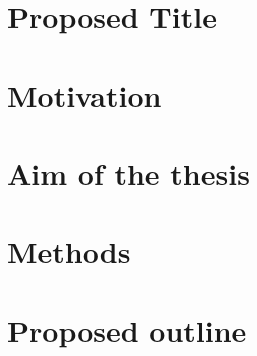 %
%
\section{Proposed Title }
\label{sec:intro:protitle}

%
%
\section{Motivation}
\label{sec:intro:motivation}

%
%
\section{Aim of the thesis}
\label{sec:intro:aim}



\section{Methods}
\label{sec:intro:methods}

\section{Proposed outline}
\label{sec:intro:outline}